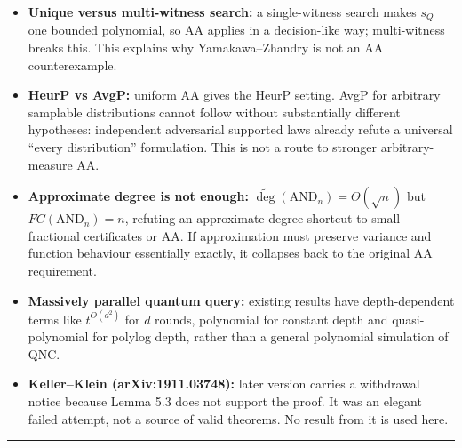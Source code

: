 \begin{itemize}
\tightlist
\item
  \textbf{Unique versus multi-witness search:} a single-witness search makes \(s_Q\) one bounded polynomial, so AA applies in a decision-like way; multi-witness breaks this. This explains why Yamakawa--Zhandry is not an AA counterexample.
\item
  \textbf{HeurP vs AvgP:} uniform AA gives the HeurP setting. AvgP for arbitrary samplable distributions cannot follow without substantially different hypotheses: independent adversarial supported laws already refute a universal ``every distribution'' formulation. This is not a route to stronger arbitrary-measure AA.
\item
  \textbf{Approximate degree is not enough:} \(\widetilde{\deg}(\mathrm{AND}_n)=\Theta(\sqrt n)\) but \(FC(\mathrm{AND}_n)=n\), refuting an approximate-degree shortcut to small fractional certificates or AA. If approximation must preserve variance and function behaviour essentially exactly, it collapses back to the original AA requirement.
\item
  \textbf{Massively parallel quantum query:} existing results have depth-dependent terms like \(t^{O(d^2)}\) for \(d\) rounds, polynomial for constant depth and quasi-polynomial for polylog depth, rather than a general polynomial simulation of QNC.
\item
  \textbf{Keller--Klein (arXiv:1911.03748):} later version carries a withdrawal notice because Lemma 5.3 does not support the proof. It was an elegant failed attempt, not a source of valid theorems. No result from it is used here.
\end{itemize}

\begin{center}\rule{0.5\linewidth}{0.5pt}\end{center}
